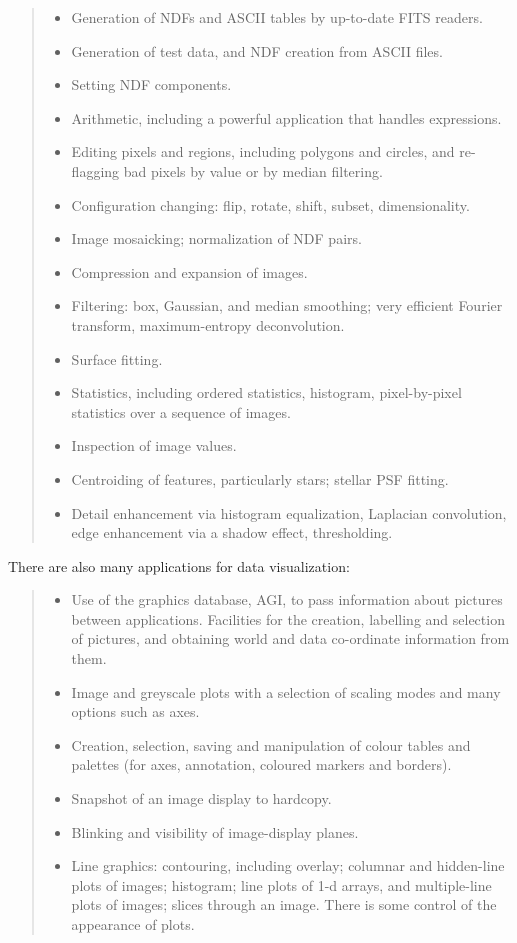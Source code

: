 {\small
\begin{quote}
\begin{itemize}
\item Generation of NDFs and ASCII tables by up-to-date FITS readers.
\item Generation of test data, and NDF creation from ASCII files.
\item Setting NDF components.
\item Arithmetic, including a powerful application that handles expressions.
\item Editing pixels and regions, including polygons and circles, and
 re-flagging bad pixels by value or by median filtering.
\item Configuration changing: flip, rotate, shift, subset, dimensionality.
\item Image mosaicking; normalization of NDF pairs.
\item Compression and expansion of images.
\item Filtering: box, Gaussian, and median smoothing; very efficient Fourier
 transform, maximum-entropy deconvolution.
\item Surface fitting.
\item Statistics, including ordered statistics, histogram, pixel-by-pixel
 statistics over a sequence of images.
\item Inspection of image values.
\item Centroiding of features, particularly stars; stellar PSF fitting.
\item Detail enhancement via histogram equalization, Laplacian convolution,
 edge enhancement via a shadow effect, thresholding.
\end{itemize}
\end{quote}
}

There are also many applications for data visualization:

{\small
\begin{quote}
\begin{itemize}
\item Use of the graphics database, AGI, to pass information about pictures
 between applications.
 Facilities for the creation, labelling and selection of pictures, and
 obtaining world and data co-ordinate information from them.
\item Image and greyscale plots with a selection of scaling modes and many
 options such as axes.
\item Creation, selection, saving and manipulation of colour tables and
 palettes (for axes, annotation, coloured markers and borders).
\item Snapshot of an image display to hardcopy.
\item Blinking and visibility of image-display planes.
\item Line graphics: contouring, including overlay; columnar and hidden-line
 plots of images; histogram; line plots of 1-d arrays, and multiple-line plots
 of images; slices through an image.
 There is some control of the appearance of plots.
\end{itemize}
\end{quote}
}


